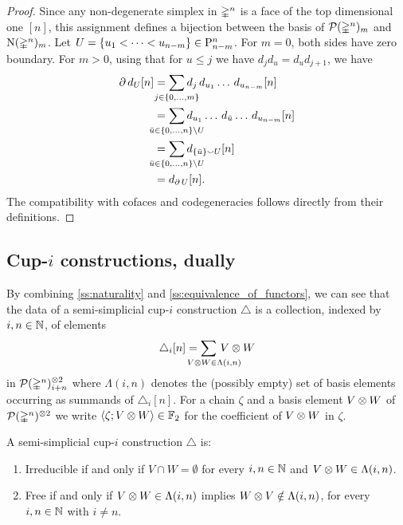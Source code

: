 \begin{proof}
	Since any non-degenerate simplex in $\mathbb{\Delta}^n$ is a face of the top dimensional one $[n]$, this assignment defines a bijection between the basis of $\mathcal{P}(\mathbb{\Delta}^n)_m$ and $\operatorname{N}(\mathbb{\Delta}^n)_m$.
	Let $U = \{u_1 < \dots < u_{n-m}\} \in \mathrm{P}_{n-m}^n$.
	For $m=0$, both sides have zero boundary.
	For $m>0$, using that for $u \leq j$ we have $d_jd_u = d_ud_{j+1}$, we have
	\begin{align*}
		\bd d_U[n] &=
		\sum_{\mathclap{j \in \{0, \dots, m\}}}
		d_j\, d_{u_1} \dots\, d_{u_{n-m}}[n] \\ &=
		\sum_{\mathclap{\bar u \in \{0, \dots, n\} \setminus U}}
		d_{u_1} \dots\, d_{\bar{u}} \dots\, d_{u_{n-m}}[n] \\ &=
		\sum_{\mathclap{\bar u \in \{0, \dots, n\} \setminus U}}
		d_{\{\bar u\} \union U}[n] \\ &=
		d_{\bd U}[n].
	\end{align*}
	The compatibility with cofaces and codegeneracies follows directly from their definitions.
\end{proof}

\subsection{Cup-$i$ constructions, dually}\label{ss:axioms_revisited}

By combining \cref{ss:naturality} and \cref{ss:equivalence_of_functors}, we can see that the data of a semi-simplicial \mbox{cup-$i$} construction $\triangle$ is a collection, indexed by $i,n \in \mathbb{N}$, of elements
\begin{equation*}\label{eq:cup-i_dually}
	\triangle_i [n] =
	\sum_{\mathclap{\quad V \ot W \in \Lambda(i,n)}} \, V \ot W
\end{equation*}
in $\mathcal{P}(\mathbb{\Delta}^n)^{\otimes 2}_{i+n}$
where $\Lambda(i,n)$ denotes the (possibly empty) set of basis elements occurring as summands of $\triangle_i[n]$.
For a chain $\zeta$ and a basis element $V \otimes W$ of $\mathcal{P}(\mathbb{\Delta}^n)^{\otimes 2}$ we write $\langle \zeta ; V \otimes W \rangle \in {\mathbb{F}_2}$ for the coefficient of $V \otimes W$ in $\zeta$.

\begin{lemma}\label{l:dual_axioms}
	A semi-simplicial \mbox{cup-$i$} construction $\triangle$ is:
	\begin{enumerate}
		\item Irreducible if and only if $V \cap W = \emptyset$
		for every $i, n \in \mathbb{N}$ and $V \otimes W \in \Lambda(i,n)$.
		\item Free if and only if $V \otimes W \in \Lambda(i,n)$ implies $W \otimes V \notin \Lambda(i,n)$,
		for every $i, n \in \mathbb{N}$ with $i \neq n$.
	\end{enumerate}
\end{lemma}

